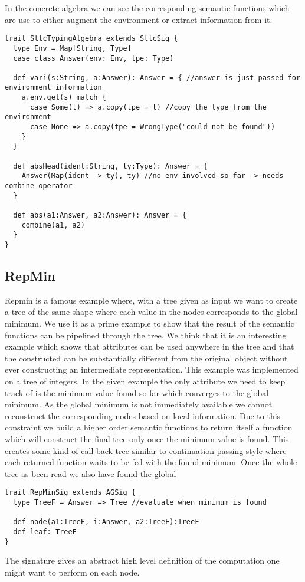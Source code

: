 In the concrete algebra we can see the corresponding semantic functions which are use to either augment the environment or extract information from it.
\begin{lstlisting}
trait SltcTypingAlgebra extends StlcSig {
  type Env = Map[String, Type]
  case class Answer(env: Env, tpe: Type)

  def vari(s:String, a:Answer): Answer = { //answer is just passed for environment information
    a.env.get(s) match {
      case Some(t) => a.copy(tpe = t) //copy the type from the environment
      case None => a.copy(tpe = WrongType("could not be found"))
    }
  }

  def absHead(ident:String, ty:Type): Answer = {
    Answer(Map(ident -> ty), ty) //no env involved so far -> needs combine operator
  }

  def abs(a1:Answer, a2:Answer): Answer = {
    combine(a1, a2)
  }
}
\end{lstlisting}

\subsection{RepMin}
Repmin is a famous example where, with a tree given as input we want to create a tree of the same shape where each value in the nodes corresponds to the global minimum. 
We use it as a prime example to show that the result of the semantic functions can be pipelined through the tree. We think that it is an interesting example which shows that attributes can be used anywhere in the tree and that the constructed can be substantially different from the original object without ever constructing an intermediate representation.
This example was implemented on a tree of integers. In the given example the only attribute we need to keep track of is the minimum value found so far which converges to the global minimum. As the global minimum is not immediately available we cannot reconstruct the corresponding nodes based on local information. Due to this constraint we build a higher order semantic functions to return itself a function which will construct the final tree only once the minimum value is found. This creates some kind of call-back tree similar to continuation passing style where each returned function waits to be fed with the found minimum. Once the whole tree as been read we also have found the global 

\begin{lstlisting}
trait RepMinSig extends AGSig {
  type TreeF = Answer => Tree //evaluate when minimum is found

  def node(a1:TreeF, i:Answer, a2:TreeF):TreeF
  def leaf: TreeF
}
\end{lstlisting}
The signature gives an abstract high level definition of the computation one might want to perform on each node.


